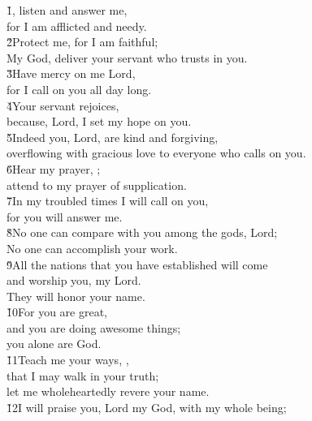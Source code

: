 \begin{poetry}
\poeml \v{1}, listen and answer me, \\
\poemll    for I am afflicted and needy. \\
\poeml \v{2}Protect me, for I am faithful; \\
\poemll    My God, deliver your servant who trusts in you. \\
\poeml \v{3}Have mercy on me Lord, \\
\poemll    for I call on you all day long. \\
\poeml \v{4}Your servant rejoices, \\
\poemll    because, Lord, I set my hope on you. \\
\poeml \v{5}Indeed you, Lord, are kind and forgiving, \\
\poemll    overflowing with gracious love to everyone who calls on you. \\
\poeml \v{6}Hear my prayer, ; \\
\poemll    attend to my prayer of supplication. \\
\poeml \v{7}In my troubled times I will call on you, \\
\poemll    for you will answer me. \\
\poeml \v{8}No one can compare with you among the gods, Lord; \\
\poemll    No one can accomplish your work. \\
\poeml \v{9}All the nations that you have established will come \\
\poemll    and worship you, my Lord. \\
\poemlll       They will honor your name. \\
\poeml \v{10}For you are great, \\
\poemll    and you are doing awesome things; \\
\poemlll       you alone are God. \\
\poeml \v{11}Teach me your ways, , \\
\poemll    that I may walk in your truth; \\
\poemlll       let me wholeheartedly revere your name. \\
\poeml \v{12}I will praise you, Lord my God, with my whole being; \\

\end{poetry}
